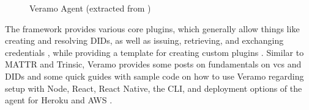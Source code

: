     \begin{figure}[ht]
	    \centering    	    \makebox[\textwidth]{}
        \caption{Veramo Agent (extracted from \cite{veramo_veramo_2021-2})}
        \label{figure: veramo agent}
    \end{figure}
    
    The framework provides various core plugins, which generally allow things like creating and resolving \acp{DID}, as well as issuing, retrieving, and exchanging credentials \cite{veramo_veramo_2021-2}, while providing a template for creating custom plugins \cite{veramo_uport-projectveramo-plugin_2021}. Similar to MATTR and Trinsic, Veramo provides some posts on fundamentals on \acp{vc} and \acp{DID} and some quick guides with sample code on how to use Veramo regarding setup with Node, React, React Native, the CLI, and deployment options of the agent for Heroku and AWS \cite{veramo_veramo_2021-2}.
    
